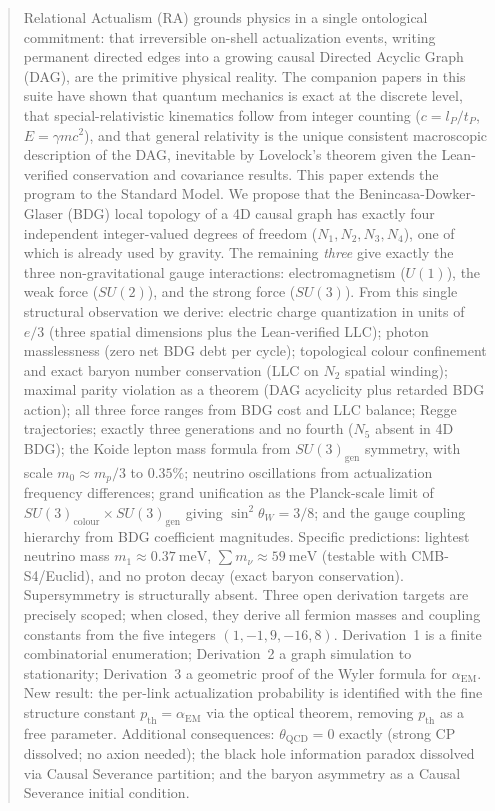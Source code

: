 \documentclass[11pt,a4paper]{article}
\begin{document}
\begin{abstract}
Relational Actualism (RA) grounds physics in a single ontological commitment:
that irreversible on-shell actualization events, writing permanent directed
edges into a growing causal Directed Acyclic Graph (DAG), are the primitive
physical reality. The companion papers in this suite have shown that quantum
mechanics is exact at the discrete level, that special-relativistic kinematics
follow from integer counting ($c = l_P/t_P$, $E = \gamma mc^2$), and that
general relativity is the unique consistent macroscopic description of the DAG,
inevitable by Lovelock's theorem given the Lean-verified conservation and
covariance results. This paper extends the program to the Standard Model.
We propose that the Benincasa-Dowker-Glaser (BDG) local topology of a 4D
causal graph has exactly four independent integer-valued degrees of freedom
($N_1, N_2, N_3, N_4$), one of which is already used by gravity.
The remaining \emph{three} give exactly the three non-gravitational gauge
interactions: electromagnetism ($U(1)$), the weak force ($SU(2)$), and the
strong force ($SU(3)$). From this single structural observation we derive:
electric charge quantization in units of $e/3$ (three spatial dimensions plus
the Lean-verified LLC); photon masslessness (zero net BDG debt per cycle);
topological colour confinement and exact baryon number conservation (LLC on
$N_2$ spatial winding); maximal parity violation as a theorem (DAG acyclicity
plus retarded BDG action); all three force ranges from BDG cost and LLC balance;
Regge trajectories; exactly three generations and no fourth ($N_5$ absent in
4D BDG); the Koide lepton mass formula from $SU(3)_{\mathrm{gen}}$ symmetry,
with scale $m_0 \approx m_p/3$ to $0.35\%$; neutrino oscillations from
actualization frequency differences; grand unification as the Planck-scale limit
of $SU(3)_{\mathrm{colour}} \times SU(3)_{\mathrm{gen}}$ giving
$\sin^2\theta_W = 3/8$; and the gauge coupling hierarchy from BDG coefficient
magnitudes. Specific predictions: lightest neutrino mass $m_1 \approx 0.37~\mathrm{meV}$,
$\sum m_\nu \approx 59~\mathrm{meV}$ (testable with CMB-S4/Euclid), and no proton
decay (exact baryon conservation). Supersymmetry is structurally absent.
Three open derivation targets are precisely scoped; when closed, they derive
all fermion masses and coupling constants from the five integers
$(1,-1,9,-16,8)$. Derivation~1 is a finite combinatorial enumeration;
Derivation~2 a graph simulation to stationarity; Derivation~3 a geometric proof
of the Wyler formula for $\alpha_{\mathrm{EM}}$.
New result: the per-link actualization probability is identified with the
fine structure constant $p_{\mathrm{th}} = \alpha_{\mathrm{EM}}$ via the
optical theorem, removing $p_{\mathrm{th}}$ as a free parameter.
Additional consequences: $\theta_{\mathrm{QCD}} = 0$ exactly
(strong CP dissolved; no axion needed); the black hole information
paradox dissolved via Causal Severance partition; and the baryon
asymmetry as a Causal Severance initial condition.


\end{abstract}
\end{document}

